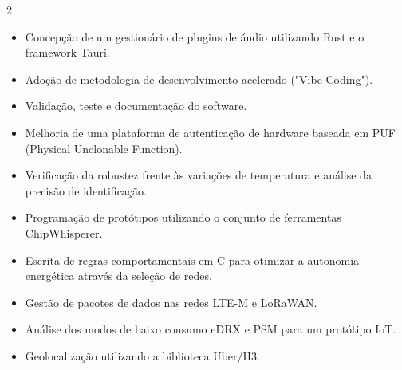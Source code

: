 \documentclass[10pt,a4paper,ragged2e,withhyper]{altacv}
\begin{document}
\begin{paracol}{2}


\begin{itemize}
\item Concepção de um gestionário de plugins de áudio utilizando Rust e o framework Tauri.
\item Adoção de metodologia de desenvolvimento acelerado ("Vibe Coding").
\item Validação, teste e documentação do software.
\end{itemize}

\divider


\begin{itemize}
\item Melhoria de uma plataforma de autenticação de hardware baseada em PUF (Physical
Unclonable Function).
\item Verificação da robustez frente às variações de temperatura e análise da precisão de identificação.
\item Programação de protótipos utilizando o conjunto de ferramentas ChipWhisperer.
\end{itemize}

\divider


\begin{itemize}
\item Escrita de regras comportamentais em C para otimizar a autonomia energética através da seleção de redes.
\item Gestão de pacotes de dados nas redes LTE-M e LoRaWAN.
\item Análise dos modos de baixo consumo eDRX e PSM para um protótipo IoT.
\item Geolocalização utilizando a biblioteca Uber/H3.
\end{itemize}

\divider



\end{paracol}
\end{document}
